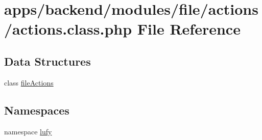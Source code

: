 \hypertarget{backend_2modules_2file_2actions_2actions_8class_8php}{\section{apps/backend/modules/file/actions/actions.class.\-php File Reference}
\label{backend_2modules_2file_2actions_2actions_8class_8php}
}
\subsection*{Data Structures}
\begin{DoxyCompactItemize}
\item 
class \hyperlink{classfile_actions}{file\-Actions}
\end{DoxyCompactItemize}
\subsection*{Namespaces}
\begin{DoxyCompactItemize}
\item 
namespace \hyperlink{namespacelufy}{lufy}
\end{DoxyCompactItemize}
